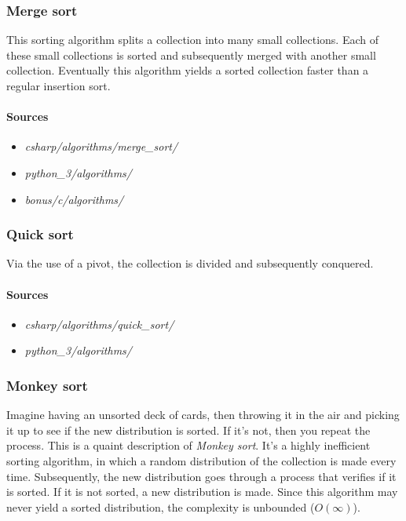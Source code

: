 \documentclass{article}
\begin{document}
\subsubsection{Merge sort}
This sorting algorithm splits a collection into many small collections.
Each of these small collections is sorted and subsequently merged with another small collection.
Eventually this algorithm yields a sorted collection faster than a regular insertion sort.

\paragraph{Sources}
\begin{itemize}
\item{{\em csharp/algorithms/merge\_sort/}}
\item{{\em python\_3/algorithms/}}
\item{{\em bonus/c/algorithms/}}
\end{itemize}


\subsubsection{Quick sort}
Via the use of a pivot, the collection is divided and subsequently conquered.

\paragraph{Sources}
\begin{itemize}
\item{{\em csharp/algorithms/quick\_sort/}}
\item{{\em python\_3/algorithms/}}
\end{itemize}


\subsubsection{Monkey sort}
Imagine having an unsorted deck of cards, then throwing it in the air and picking it up to see if the new distribution is sorted.
If it's not, then you repeat the process. This is a quaint description of {\em Monkey sort}.
It's a highly inefficient sorting algorithm, in which a random distribution of the collection is made every time.
Subsequently, the new distribution goes through a process that verifies if it is sorted. If it is not sorted, a new distribution is made.
Since this algorithm may never yield a sorted distribution, the complexity is unbounded (\(O(\infty)\)).
\end{document}
